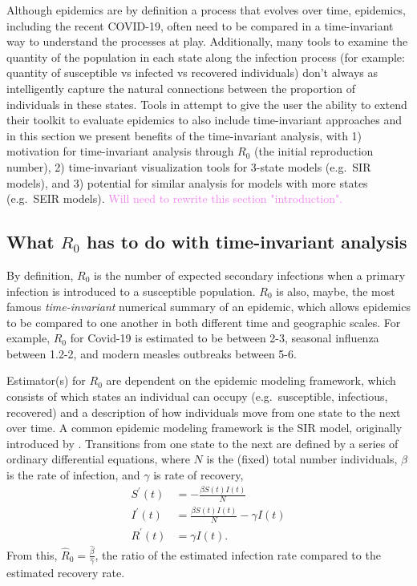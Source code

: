 \documentclass[
  shortnames]{jss}
\begin{document}
Although epidemics are by definition a process that evolves over time,
epidemics, including the recent COVID-19, often need to be compared in a
time-invariant way to understand the processes at play. Additionally,
many tools to examine the quantity of the population in each state along
the infection process (for example: quantity of susceptible vs infected
vs recovered individuals) don't always as intelligently capture the
natural connections between the proportion of individuals in these
states. Tools in  attempt to give the user the ability
to extend their toolkit to evaluate epidemics to also include
time-invariant approaches and in this section we present benefits of the
time-invariant analysis, with 1) motivation for time-invariant analysis
through \(R_0\) (the initial reproduction number), 2) time-invariant
visualization tools for 3-state models (e.g.~SIR models), and 3)
potential for similar analysis for models with more states (e.g.~SEIR
models).
\textcolor{violet}{Will need to rewrite this section "introduction".}

\subsection[r0]{What \(R_0\) has to do with time-invariant
analysis}\label{r0}

By definition, \(R_0\) is the number of expected secondary infections
when a primary infection is introduced to a susceptible population.
\(R_0\) is also, maybe, the most famous \textit{time-invariant}
numerical summary of an epidemic, which allows epidemics to be compared
to one another in both different time and geographic scales. For
example, \(R_0\) for Covid-19 is estimated to be between 2-3, seasonal
influenza between 1.2-2, and modern measles outbreaks between 5-6.

Estimator(s) for \(R_0\) are dependent on the epidemic modeling
framework, which consists of which states an individual can occupy
(e.g.~susceptible, infectious, recovered) and a description of how
individuals move from one state to the next over time. A common epidemic
modeling framework is the SIR model, originally introduced by
\citet{kermack1927}. Transitions from one state to the next are defined
by a series of ordinary differential equations, where \(N\) is the
(fixed) total number individuals, \(\beta\) is the rate of infection,
and \(\gamma\) is rate of recovery, \begin{align}\label{eq:sir-ode}
      S^\prime(t) &= -\frac{\beta S(t)I(t)}{N} \\
      I^\prime(t) &= \frac{\beta S(t)I(t)}{N} - \gamma I(t) \nonumber\\
      R^\prime(t) &= \gamma I(t) \nonumber.
  \end{align} From this,
\(\hat{R}_0 = \frac{\hat{\beta}}{\hat{\gamma}}\), the ratio of the
estimated infection rate compared to the estimated recovery rate.
\end{document}
